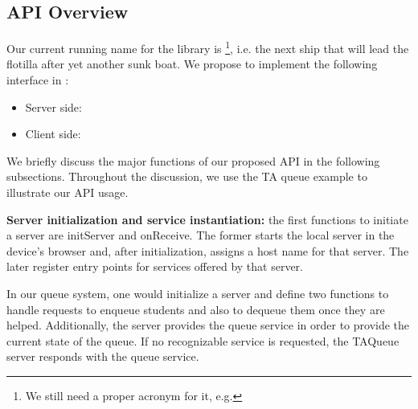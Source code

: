 \subsection{API Overview}

Our current running name for the library is \texttt{\APIName}\footnote{We still need a proper acronym for it, e.g. \APIshort}, i.e. the next ship that will lead the flotilla after yet another sunk boat. We propose to implement the following interface in \APIName:


\begin{itemize}
	\item Server side:
    \begin{itemize}
    \end{itemize}
    \item Client side:
    	\begin{itemize}
    	\end{itemize}
\end{itemize}


We briefly discuss the major functions of our proposed API in the following subsections. Throughout the discussion, we use the TA queue example to illustrate our API usage.

{\bf Server initialization and service instantiation: } the first functions to initiate a server are {\ttfamily initServer} and {\ttfamily onReceive}. The former starts the local server in the device's browser and, after initialization, assigns a host name for that server. The later register entry points for services offered by that server.

In our queue system, one would initialize a server and define two functions to handle requests to enqueue students and also to dequeue them once they are helped. Additionally, the server provides the queue service in order to provide the current state of the queue. If no recognizable service is requested, the TAQueue server responds with the queue service.

